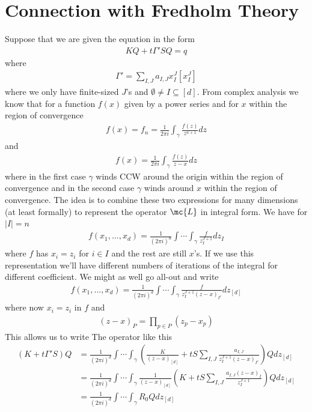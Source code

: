 \section{Connection with Fredholm Theory}
Suppose that we are given the equation in the form
\begin{align}
	KQ +t\Gamma'SQ = q
\end{align}
where
\begin{align}
	\Gamma' = \sum_{I,J}a_{I,J} x_I^J[x_I^J]
\end{align}
where we only have finite-sized $J$'s and $\emptyset \neq I\subseteq [d]$. From complex analysis we know that for a function $f(x)$ given by a power series and for $x$ within the region of convergence
\begin{align}
	[x^n]f(x) = f_n = \frac{1}{2\pi i}\int_\gamma \frac{f(z)}{z^{n+1}}dz
\end{align}
and
\begin{align}
	f(x) = \frac{1}{2\pi i}\int_\gamma \frac{f(z)}{z-x}dz
\end{align}
where in the first case $\gamma$ winds CCW around the origin within the region of convergence and in the second case $\gamma$ winds around $x$ within the region of convergence. The idea is to combine these two expressions for many dimensions (at least formally) to represent the operator $\mc{L}$ in integral form. We have for $|I| = n$
\begin{align}
	[x_I^J]f(x_1,\ldots,x_d)= \frac{1}{(2\pi i)^{n}}\int\cdots\int_\gamma \frac{f}{z_I^{J+1}}dz_I
\end{align}
where $f$ has $x_i = z_i$ for $i \in I$ and the rest are still $x$'s. If we use this representation we'll have different numbers of iterations of the integral for different coefficient. We might as well go all-out and write
\begin{align}
	[x_I^J]f(x_1,\ldots,x_d)= \frac{1}{(2\pi i)^d}\int\cdots\int_\gamma \frac{f}{z_I^{J+1}(z-x)_{I^c}}dz_{[d]}
\end{align}
where now $x_i = z_i$ in $f$ and 
\begin{align}
	(z-x)_P = \prod_{p\in P} (z_p-x_p)
\end{align}
This allows us to write The operator like this
\begin{align}
	(K+t\Gamma'S)Q&= \frac{1}{(2\pi i)^d}\int\cdots\int_\gamma \left(\frac{K}{(z-x)_{[d]}} +t S\sum_{I,J}\frac{a_{I,J}}{z_I^{J+1}(z-x)_{I^c}}\right)Q dz_{[d]}\\
	& = \frac{1}{(2\pi i)^d}\int\cdots\int_\gamma \frac{1}{(z-x)_{[d]}}\left(K +t S\sum_{I,J}\frac{a_{I,J}(z-x)_I}{z_I^{J+1}}\right)Q dz_{[d]}\\
	&= \frac{1}{(2\pi i)^d}\int\cdots\int_\gamma R_0Q dz_{[d]}
\end{align}
